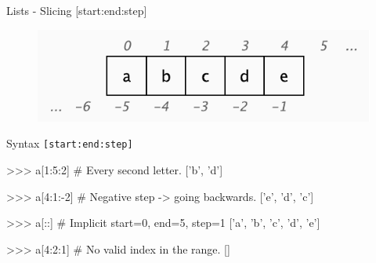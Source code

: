 \documentclass[10pt]{beamer}
\begin{document}
\begin{frame}[fragile]{Lists - Slicing [start:end:step]}

\vspace*{-0.1cm}
\begin{figure}[!h]
\centering
\includegraphics[width=0.55\linewidth]{img/slicing.pdf}
\end{figure}

\vspace*{-0.3cm}

Syntax \small{\texttt{[start:end:step]}}


\begin{pythoncode}
>>> a[1:5:2]  # Every second letter.
['b', 'd']
\end{pythoncode}


\begin{pythoncode}
>>> a[4:1:-2]  # Negative step -> going backwards.
['e', 'd', 'c']
\end{pythoncode}


\begin{pythoncode}
>>> a[::]  # Implicit start=0, end=5, step=1
['a', 'b', 'c', 'd', 'e']
\end{pythoncode}


\begin{pythoncode}
>>> a[4:2:1]  # No valid index in the range.
[]
\end{pythoncode}
\end{frame}
\end{document}
